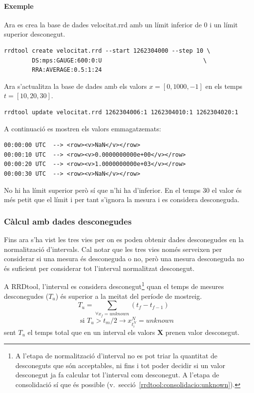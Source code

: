 \paragraph{Exemple} Ara es crea la base de dades velocitat.rrd amb un límit inferior de 0 i un límit superior desconegut.

\begin{lstlisting}[style=sh]
rrdtool create velocitat.rrd --start 1262304000 --step 10 \
        DS:mps:GAUGE:600:0:U                             \
        RRA:AVERAGE:0.5:1:24                                 
\end{lstlisting}

Ara s'actualitza la base de dades amb els valors $x=[0,1000,-1]$ en els temps $t=[10,20,30]$.

\begin{lstlisting}[style=sh]
rrdtool update velocitat.rrd 1262304006:1 1262304010:1 1262304020:1 
\end{lstlisting}

A continuació es mostren els valors emmagatzemats:
\begin{lstlisting}
00:00:00 UTC  --> <row><v>NaN</v></row>
00:00:10 UTC  --> <row><v>0.0000000000e+00</v></row>
00:00:20 UTC  --> <row><v>1.0000000000e+03</v></row>
00:00:30 UTC  --> <row><v>NaN</v></row>
\end{lstlisting}

No hi ha límit superior però sí que n'hi ha d'inferior. En el temps 30 el valor és més petit que el límit i per tant s'ignora la mesura i es considera desconeguda.


\subsubsection{Càlcul amb dades desconegudes}

Fins ara s'ha vist les tres vies per on es poden obtenir dades desconegudes en la normalització d'intervals. Cal notar que les tres vies només serveixen per considerar si una mesura és desconeguda o no, però una mesura desconeguda no és suficient per considerar tot l'interval normalitzat desconegut.

A RRDtool, l'interval es considera desconegut\footnote{A l'etapa de normalització d'interval no es pot triar la quantitat de desconeguts que són acceptables, ni fins i tot poder decidir si un valor desconegut ja fa calcular tot l'interval com desconegut. A l'etapa de consolidació sí que és possible (v.\ secció~\ref{rrdtool:consolidacio:unknown}).}
quan el temps de mesures desconegudes ($T_u$)  és superior a la meitat del període de mostreig.
$$
T_u = \sum_{\forall x_f = unknown} ( t_f-t_{f-1} ) \quad
$$
$$
\text{si } T_u > t_m/2  \longrightarrow   x^N_{t^N_i} = unknown 
$$
sent $T_u$ el temps total que en un interval els valors $\mathbf{X}$ prenen valor desconegut.

